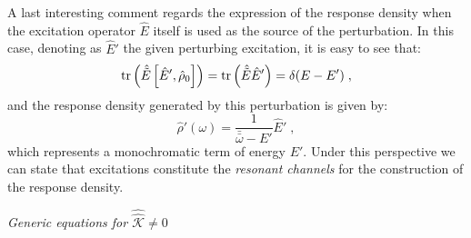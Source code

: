 \documentclass[a4paper]{article}
\newcommand{\bomega}{\bar\omega}
\newcommand{\bbomega}{\bar{\bomega}}
\newcommand{\be}{\begin{equation}}
\newcommand{\ee}{\end{equation}}
\newcommand{\nn}{\notag}
\newcommand{\op}[1]{\hat {#1}}
\newcommand{\sop}[1]{\op{\op {#1}}}
\newcommand{\commutator}[2]{\left[ {#1} , {#2} \right]}
\newcommand{\trace}[1]{\mathrm{tr}\left(#1\right)}
\newcommand{\dmnot}{\op{\rho}_0}
\newcommand{\dm}{\op{\rho}}
\newcommand{\coupl}{\sop{\mathcal K}}
\begin{document}
A last interesting comment regards the expression of the response density when the excitation operator $\op E$ itself is used as the source of the
perturbation. In this case, denoting as $\op E'$ the given perturbing excitation, it is easy to see that:
\be
\trace{\op{\tilde E}\commutator{\op E'}{\dmnot}} = \trace{\op{\tilde E}\op E'} = \delta(E-E') \;, \nn 
\ee
and the response density generated by this perturbation is given by: 
\be
\dm'(\omega) = \frac{1}{\bbomega - E'} \op E'\;,
\ee
which represents a monochromatic term of energy $E'$. Under this perspective we can state that excitations constitute
the \emph{resonant channels} for the construction  of the response density.

\vspace{0.5cm}
\emph{Generic equations for $\coupl \neq 0$}
\vspace{0.5cm}
\end{document}
